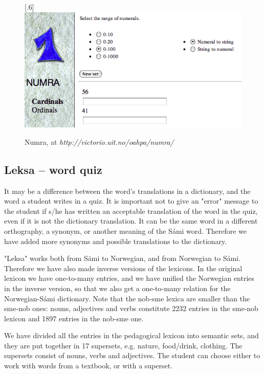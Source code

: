 \documentclass[a4paper,12pt]{article}
\begin{document}
\begin{figure}[htbp]
\begin{center}
\scalebox{.6}[.6]{\includegraphics{presentation/img/numra.png}}\\
\caption{Numra, at \textit{http://victorio.uit.no/oahpa/numra/}}
\label{numra}
\end{center}
\end{figure}

\subsection{Leksa -- word quiz}
It may be a difference between the word's translations in a dictionary, and the word a student writes in a quiz. It is important not to give an "error" message to the student if s/he has written an acceptable translation of the word in the quiz, even if it is not the dictionary translation. It can be the same word in a different orthography, a synonym, or another meaning of the Sámi word. Therefore we have added more synonyms and possible translations to the dictionary.

"Leksa" works both from Sámi to Norwegian, and from Norwegian to Sámi. Therefore we have also made inverse versions of the lexicons. In the original lexicon we have one-to-many entries, and we have unified the Norwegian entries in the inverse version, so that we also get a one-to-many relation for the Norwegian-Sámi dictionary. Note that the nob-sme lexica are smaller than the sme-nob ones: nouns, adjectives and verbs constitute 2232 entries in the sme-nob lexicon and 1897 entries in the nob-sme one.

We have divided all the entries in the pedagogical lexicon into semantic sets, and they are put together in 17 supersets, e.g. nature, food/drink, clothing. The supersets consist of nouns, verbs and adjectives. The student can choose either to work with words from a textbook, or with a superset. 
\vspace{0.5cm}
\end{document}
